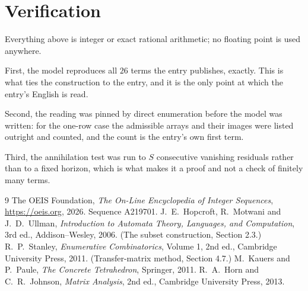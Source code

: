 \documentclass[11pt,a4paper]{article}
\theoremstyle{plain}
\theoremstyle{definition}
\begin{document}
\section{Verification}

Everything above is integer or exact rational arithmetic; no floating point is used anywhere.

First, the model reproduces all $26$ terms the entry publishes, exactly. This is what
ties the construction to the entry, and it is the only point at which the entry's English is
read.

Second, the reading was pinned by direct enumeration before the model was written: for the
one-row case the admissible arrays and their images were listed outright and counted, and the
count is the entry's own first term.

Third, the annihilation test was run to $S$ consecutive vanishing residuals rather than to a
fixed horizon, which is what makes it a proof and not a check of finitely many terms.

\begin{thebibliography}{9}
 The OEIS Foundation, \emph{The On-Line Encyclopedia of Integer
Sequences}, \url{https://oeis.org}, 2026. Sequence A219701.
 J.~E.~Hopcroft, R.~Motwani and J.~D.~Ullman, \emph{Introduction to Automata
Theory, Languages, and Computation}, 3rd ed., Addison--Wesley, 2006. (The subset
construction, Section 2.3.)
 R.~P.~Stanley, \emph{Enumerative Combinatorics}, Volume 1, 2nd ed.,
Cambridge University Press, 2011. (Transfer-matrix method, Section 4.7.)
 M.~Kauers and P.~Paule, \emph{The Concrete Tetrahedron}, Springer, 2011.
 R.~A.~Horn and C.~R.~Johnson, \emph{Matrix Analysis}, 2nd ed., Cambridge
University Press, 2013.
\end{thebibliography}
\end{document}
